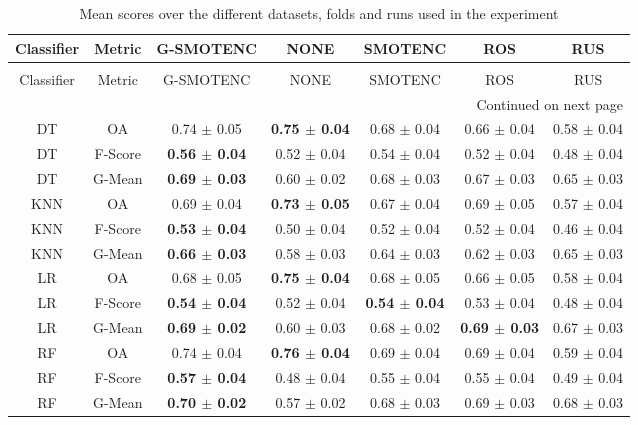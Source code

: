 \begin{longtable}{ccccccc}
\caption{Mean scores over the different datasets, folds and runs used in the experiment}
\label{tbl:mean_sem_scores}\\
\toprule
Classifier &  Metric &                G-SMOTENC &                     NONE &                  SMOTENC &                      ROS &             RUS \\
\midrule
\endfirsthead
\caption[]{Mean scores over the different datasets, folds and runs used in the experiment} \\
\toprule
Classifier &  Metric &                G-SMOTENC &                     NONE &                  SMOTENC &                      ROS &             RUS \\
\midrule
\endhead
\midrule
\multicolumn{7}{r}{{Continued on next page}} \\
\midrule
\endfoot

\bottomrule
\endlastfoot
        DT &      OA &          0.74 $\pm$ 0.05 & \textbf{0.75 $\pm$ 0.04} &          0.68 $\pm$ 0.04 &          0.66 $\pm$ 0.04 & 0.58 $\pm$ 0.04 \\
        DT & F-Score & \textbf{0.56 $\pm$ 0.04} &          0.52 $\pm$ 0.04 &          0.54 $\pm$ 0.04 &          0.52 $\pm$ 0.04 & 0.48 $\pm$ 0.04 \\
        DT &  G-Mean & \textbf{0.69 $\pm$ 0.03} &          0.60 $\pm$ 0.02 &          0.68 $\pm$ 0.03 &          0.67 $\pm$ 0.03 & 0.65 $\pm$ 0.03 \\
       KNN &      OA &          0.69 $\pm$ 0.04 & \textbf{0.73 $\pm$ 0.05} &          0.67 $\pm$ 0.04 &          0.69 $\pm$ 0.05 & 0.57 $\pm$ 0.04 \\
       KNN & F-Score & \textbf{0.53 $\pm$ 0.04} &          0.50 $\pm$ 0.04 &          0.52 $\pm$ 0.04 &          0.52 $\pm$ 0.04 & 0.46 $\pm$ 0.04 \\
       KNN &  G-Mean & \textbf{0.66 $\pm$ 0.03} &          0.58 $\pm$ 0.03 &          0.64 $\pm$ 0.03 &          0.62 $\pm$ 0.03 & 0.65 $\pm$ 0.03 \\
        LR &      OA &          0.68 $\pm$ 0.05 & \textbf{0.75 $\pm$ 0.04} &          0.68 $\pm$ 0.05 &          0.66 $\pm$ 0.05 & 0.58 $\pm$ 0.04 \\
        LR & F-Score & \textbf{0.54 $\pm$ 0.04} &          0.52 $\pm$ 0.04 & \textbf{0.54 $\pm$ 0.04} &          0.53 $\pm$ 0.04 & 0.48 $\pm$ 0.04 \\
        LR &  G-Mean & \textbf{0.69 $\pm$ 0.02} &          0.60 $\pm$ 0.03 &          0.68 $\pm$ 0.02 & \textbf{0.69 $\pm$ 0.03} & 0.67 $\pm$ 0.03 \\
        RF &      OA &          0.74 $\pm$ 0.04 & \textbf{0.76 $\pm$ 0.04} &          0.69 $\pm$ 0.04 &          0.69 $\pm$ 0.04 & 0.59 $\pm$ 0.04 \\
        RF & F-Score & \textbf{0.57 $\pm$ 0.04} &          0.48 $\pm$ 0.04 &          0.55 $\pm$ 0.04 &          0.55 $\pm$ 0.04 & 0.49 $\pm$ 0.04 \\
        RF &  G-Mean & \textbf{0.70 $\pm$ 0.02} &          0.57 $\pm$ 0.02 &          0.68 $\pm$ 0.03 &          0.69 $\pm$ 0.03 & 0.68 $\pm$ 0.03 \\
\end{longtable}
